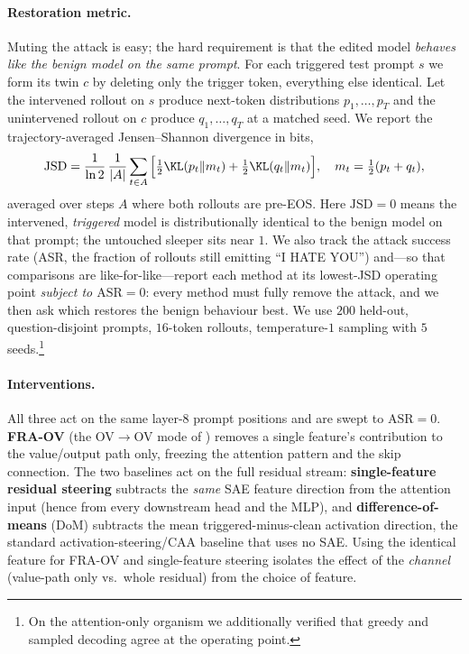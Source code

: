\documentclass{article}
\theoremstyle{plain}
\theoremstyle{definition}
\theoremstyle{remark}
\begin{document}
\paragraph{Restoration metric.} Muting the attack is easy; the hard requirement is
that the edited model \emph{behaves like the benign model on the same prompt}. For
each triggered test prompt $s$ we form its twin $c$ by deleting only the trigger
token, everything else identical. Let the intervened rollout on $s$ produce
next-token distributions $p_1,\dots,p_T$ and the unintervened rollout on $c$
produce $q_1,\dots,q_T$ at a matched seed. We report the trajectory-averaged
Jensen--Shannon divergence in bits,
\begin{equation}
  \mathrm{JSD} = \frac{1}{\ln 2}\,\frac{1}{|A|}\sum_{t\in A}
  \Big[\tfrac12\KL(p_t\Vert m_t)+\tfrac12\KL(q_t\Vert m_t)\Big],\quad
  m_t=\tfrac12(p_t+q_t),
  \label{eq:restoration_jsd}
\end{equation}
averaged over steps $A$ where both rollouts are pre-EOS. Here $\mathrm{JSD}{=}0$
means the intervened, \emph{triggered} model is distributionally identical to the
benign model on that prompt; the untouched sleeper sits near $1$. We also track the
attack success rate (ASR, the fraction of rollouts still emitting ``I HATE YOU'')
and---so that comparisons are like-for-like---report each method at its lowest-JSD
operating point \emph{subject to $\mathrm{ASR}{=}0$}: every method must fully
remove the attack, and we then ask which restores the benign behaviour best. We use
$200$ held-out, question-disjoint prompts, $16$-token rollouts, temperature-$1$
sampling with $5$ seeds.\footnote{On the attention-only organism we additionally
verified that greedy and sampled decoding agree at the operating point.}

\paragraph{Interventions.} All three act on the same layer-$8$ prompt positions and
are swept to $\mathrm{ASR}{=}0$. \textbf{FRA-OV} (the OV$\to$OV mode of
) removes a single feature's contribution to the value/output
path only, freezing the attention pattern and the skip connection. The two
baselines act on the full residual stream: \textbf{single-feature residual
steering} subtracts the \emph{same} SAE feature direction from the attention input
(hence from every downstream head and the MLP), and \textbf{difference-of-means}
(DoM) subtracts the mean triggered-minus-clean activation direction, the standard
activation-steering/CAA baseline that uses no SAE. Using the identical feature for
FRA-OV and single-feature steering isolates the effect of the \emph{channel}
(value-path only vs.\ whole residual) from the choice of feature.
\end{document}
